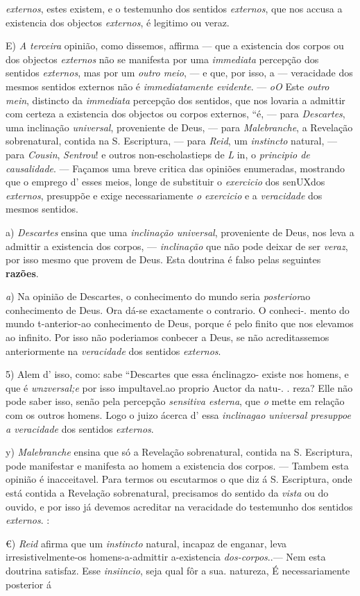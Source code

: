 \emph{externos}, estes existem, e o testemunho dos sentidos \emph{externos}, que nos accusa a existencia dos objectos \emph{externos}, é legitimo ou veraz.\par E) \emph{A terceira} opinião, como dissemos, affirma --- que a existencia dos corpos ou dos objectos \emph{externos} não se manifesta por uma \emph{immediata} percepção dos sentidos \emph{externos}, mas por um \emph{outro meio}, --- e que, por isso, a --- veracidade dos mesmos sentidos externos não é \emph{immediatamente evidente}. --- \emph{oO} Este \emph{outro mein}, distincto da \emph{immediata} percepção dos sentidos, que nos lovaria a admittir com certeza a existencia dos objectos ou corpos externos, “é, --- para \emph{Descartes}, uma inclinação \emph{universal}, proveniente de Deus, --- para \emph{Malebranche}, a Revelação sobrenatural, contida na S. Escriptura, --- para \emph{Reid}, um \emph{instincto} natural, --- para \emph{Cousin}, \emph{Sentrou}! e outros non-escholastieps de \emph{L} in, o \emph{principio de causalidade}. --- Façamos uma breve critica das opiniões enumeradas, mostrando que o emprego d' esses meios, longe de substituir o \emph{exercicio} dos senUXdos \emph{externos}, presuppõe e exige necessariamente \emph{o exercicio} e a \emph{veracidade} dos mesmos sentidos.\par a) \emph{Descartes} ensina que uma \emph{inclinação universal}, proveniente de Deus, nos leva a admittir a existencia dos corpos, --- \emph{inclinação} que não pode deixar de ser \emph{veraz}, por isso mesmo que provem de Deus. Esta doutrina é falso pelas seguintes \textbf{razões}.\par \emph{a}) Na opinião de Descartes, o conhecimento do mundo seria \emph{posterior}ao conhecimento de Deus. Ora dá-se exactamente o contrario. O conheci-. mento do mundo t-anterior-ao conhecimento de Deus, porque é pelo finito que nos elevamos ao infinito. Por isso não poderiamos conbecer a Deus, se não acreditassemos anteriormente na \emph{veracidade} dos sentidos \emph{externos}.\par 5) Alem d' isso, como: sabe “Descartes que essa énclinagzo- existe nos homens, e que é \emph{wnzversal;e} por isso impultavel.ao proprio Auctor da natu-. . reza? Elle não pode saber isso, senão pela percepção \emph{sensitiva esterna}, que \emph{o} mette em relação com os outros homens. Logo o juizo ácerca d' essa \emph{inclinagao universal presuppoe a veracidade} dos sentidos \emph{externos}.\par y) \emph{Malebranche} ensina que só a Revelação sobrenatural, contida na S. Escriptura, pode manifestar e manifesta ao homem a existencia dos corpos. --- Tambem esta opinião é inacceitavel. Para termos ou escutarmos o que diz á S. Escriptura, onde está contida a Revelação sobrenatural, precisamos do sentido da \emph{vista} ou do ouvido, e por isso já devemos acreditar na veracidade do testemunho dos sentidos \emph{externos}. :\par €) \emph{Reid} afirma que um \emph{instincto} natural, incapaz de enganar, leva irresistivelmente-os homens-a-admittir a-existencia \emph{dos-corpos}..--- Nem esta doutrina satisfaz. Esse \emph{insiincio}, seja qual fôr a sua. natureza, É necessariamente posterior á 